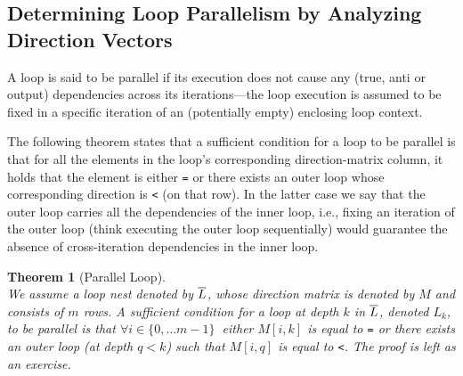 \documentclass[acmsmall,review]{acmart}\settopmatter{printfolios=true,printccs=false,printacmref=false}
\newtheorem{mytheo}{Theorem}
\begin{document}
\subsection{Determining Loop Parallelism by Analyzing Direction Vectors}
\label{subsec:loop-par}

A loop is said to be parallel if its execution does not
cause any (true, anti or output) dependencies across
its iterations---the loop execution is assumed to be fixed
in a specific iteration of an (potentially empty) enclosing
loop context.

The following theorem states that a sufficient condition for
a loop to be parallel is that for all the elements in
the loop's corresponding direction-matrix column, it holds
that the element is either {\tt=} or there exists an
outer loop whose corresponding direction is {\tt<} (on that row).
In the latter case we say that the outer loop carries
all the dependencies of the inner loop, i.e., fixing
an iteration of the outer loop (think executing the outer
loop sequentially) would guarantee the absence of cross-iteration
dependencies in the inner loop.  

\begin{mytheo}[Parallel Loop]\label{Loop-Par}
$\mbox{ }$\\
We assume a loop nest denoted by $\overline{L}$, whose direction
matrix is denoted by $M$ and consists of $m$ rows.
{\em A sufficient condition} for a loop at depth $k$ in $\overline{L}$,
denoted $L_k$, to be parallel is that
$\forall i\in\{0,\ldots m-1\}~$ either $M[i,k]$ is equal
to {\tt=} or there exists an outer loop (at depth $q<k$)
such that $M[i,q]$ is equal to {\tt<}.
\emph{The proof} is left as an exercise.
\end{mytheo}
\end{document}
